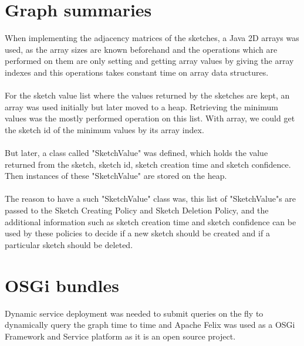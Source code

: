 \documentclass[12pt]{report}
\numberwithin{figure}{section}
\numberwithin{table}{section}
\begin{document}
\section{Graph summaries}
When implementing the adjacency matrices of the sketches, a Java 2D arrays was used, as the array sizes are known  beforehand and the operations which are performed on them are only setting and getting array values by giving the array indexes and this operations takes constant time on array data structures.

\paragraph{}

For the sketch value list where the values returned by the sketches are kept, an array was used initially but later moved to a heap. Retrieving the minimum values was the mostly performed operation on this list.  With array, we could get the sketch id of the minimum values by its array index. 

\paragraph{}

But later, a class called "SketchValue" was defined, which holds the value returned from the sketch, sketch id, sketch creation time and sketch confidence. Then instances of these "SketchValue" are stored on the heap. 

\paragraph{}

The reason to have a such "SketchValue" class was, this list of "SketchValue"s are passed to the Sketch Creating Policy and Sketch Deletion Policy, and the additional information such as sketch creation time and sketch confidence can be used by these policies to decide if a new sketch should be created and if a particular sketch should be deleted.
 
\section{OSGi bundles}

Dynamic service deployment was needed to submit queries on the fly to dynamically query the graph time to time and Apache Felix was used as a OSGi Framework and Service platform as it is an open source project. 
\end{document}
